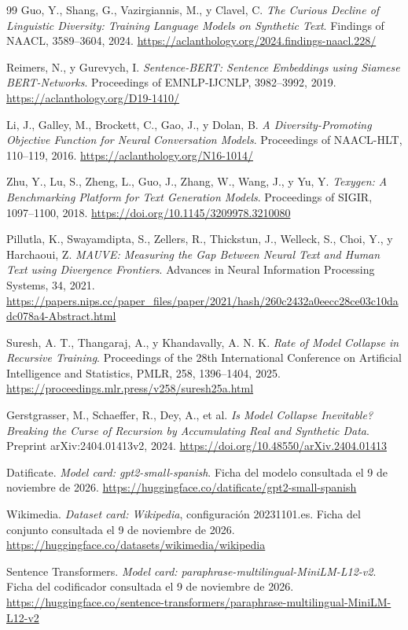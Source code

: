 \documentclass[12pt,letterpaper]{article}
\begin{document}
\begin{thebibliography}{99}
Guo, Y., Shang, G., Vazirgiannis, M., y Clavel, C.
\textit{The Curious Decline of Linguistic Diversity:
Training Language Models on Synthetic Text}.
Findings of NAACL, 3589--3604, 2024.
\url{https://aclanthology.org/2024.findings-naacl.228/}

Reimers, N., y Gurevych, I.
\textit{Sentence-BERT: Sentence Embeddings using Siamese BERT-Networks}.
Proceedings of EMNLP-IJCNLP, 3982--3992, 2019.
\url{https://aclanthology.org/D19-1410/}

Li, J., Galley, M., Brockett, C., Gao, J., y Dolan, B.
\textit{A Diversity-Promoting Objective Function for Neural Conversation Models}.
Proceedings of NAACL-HLT, 110--119, 2016.
\url{https://aclanthology.org/N16-1014/}

Zhu, Y., Lu, S., Zheng, L., Guo, J., Zhang, W., Wang, J., y Yu, Y.
\textit{Texygen: A Benchmarking Platform for Text Generation Models}.
Proceedings of SIGIR, 1097--1100, 2018.
\url{https://doi.org/10.1145/3209978.3210080}

Pillutla, K., Swayamdipta, S., Zellers, R., Thickstun, J.,
Welleck, S., Choi, Y., y Harchaoui, Z.
\textit{MAUVE: Measuring the Gap Between Neural Text and Human Text
using Divergence Frontiers}.
Advances in Neural Information Processing Systems, 34, 2021.
\url{https://papers.nips.cc/paper_files/paper/2021/hash/260c2432a0eecc28ce03c10dadc078a4-Abstract.html}

Suresh, A. T., Thangaraj, A., y Khandavally, A. N. K.
\textit{Rate of Model Collapse in Recursive Training}.
Proceedings of the 28th International Conference on Artificial Intelligence
and Statistics, PMLR, 258, 1396--1404, 2025.
\url{https://proceedings.mlr.press/v258/suresh25a.html}

Gerstgrasser, M., Schaeffer, R., Dey, A., et al.
\textit{Is Model Collapse Inevitable? Breaking the Curse of Recursion
by Accumulating Real and Synthetic Data}.
Preprint arXiv:2404.01413v2, 2024.
\url{https://doi.org/10.48550/arXiv.2404.01413}

Datificate. \textit{Model card: gpt2-small-spanish}.
Ficha del modelo consultada el 9 de noviembre de 2026.
\url{https://huggingface.co/datificate/gpt2-small-spanish}

Wikimedia. \textit{Dataset card: Wikipedia}, configuración 20231101.es.
Ficha del conjunto consultada el 9 de noviembre de 2026.
\url{https://huggingface.co/datasets/wikimedia/wikipedia}

Sentence Transformers. \textit{Model card: paraphrase-multilingual-MiniLM-L12-v2}.
Ficha del codificador consultada el 9 de noviembre de 2026.
\url{https://huggingface.co/sentence-transformers/paraphrase-multilingual-MiniLM-L12-v2}

\end{thebibliography}
\end{document}

